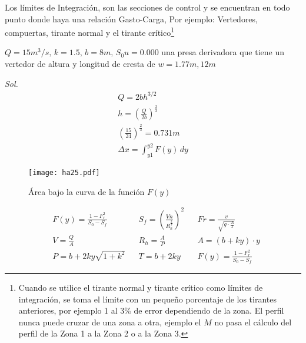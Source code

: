Los límites de Integración, son las secciones de control y se encuentran en todo punto donde haya una relación Gasto-Carga, Por ejemplo: Vertedores, compuertas, tirante normal y el tirante crítico\footnote{Cuando se utilice el tirante normal y tirante crítico como límites de integración, se toma el límite con un pequeño porcentaje de los tirantes anteriores, por ejemplo 1 al 3\% de error dependiendo de la zona. El perfil nunca puede cruzar de una zona a otra, ejemplo el $M$ no pasa el cálculo del perfil de la Zona 1 a la Zona 2 o a la Zona 3.}

\begin{example}
    $Q=15 m^3/s,\, k=1.5,\, b=8m,\, S_0u= 0.000$ una presa derivadora que tiene un vertedor de altura y longitud de cresta de $w=1.77m, 12m$
\end{example}
\textit{ Sol. }
\begin{align*}
    Q = 2bh^{3/2}\\
    h = \left(\frac{Q}{2b}\right)^{\frac{2}{3}}\\
    \left(\frac{15}{24}\right)^{\frac{2}{3}} = 0.731m\\
    \Delta x =\int_{y1}^{y2}F(y)\,dy
\end{align*}
\begin{figure}[h!]
\centering
  \texttt{[image: ha25.pdf]}
  \caption{Área bajo la curva de la función $F(y)$}
  \label{ha25}
\end{figure}
\begin{align*}
    &F(y) = \frac{1 - F_r^2}{S_0 - S_f}&& S_f =\left(\frac{Vn}{R_h^{\frac{2}{3}}}\right)^2&&Fr = \frac{v}{\sqrt{g\cdot \frac{A}{T}}}\\
    &V =\frac{Q}{A}&&R_h = \frac{A}{P}&&A =(b+ ky)\cdot y\\
    &P = b + 2ky \sqrt{1 + k^2}&& T =b + 2ky&&F(y) = \frac{1 -F^2_r}{S_0 -S_f}
\end{align*}


